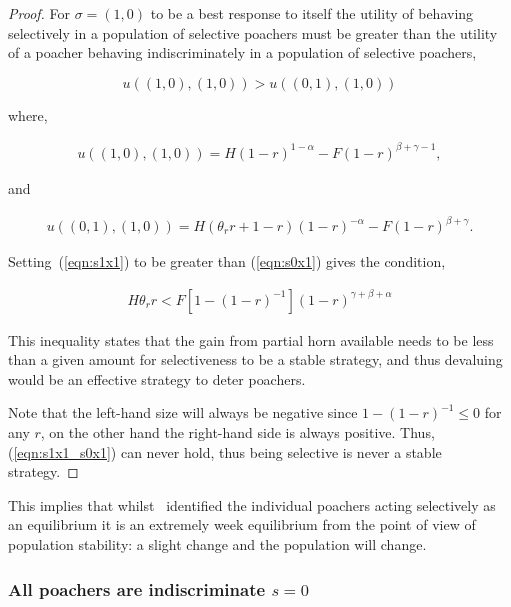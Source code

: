 \documentclass[10pt]{article}
\begin{document}
\begin{proof}
	For \(\sigma=(1, 0)\) to be a best response to itself the utility of behaving 
	selectively in a population of selective poachers must be greater than the utility
	of a poacher behaving indiscriminately in a population of selective poachers,

	\begin{equation}
	u((1, 0),(1, 0)) > u((0, 1),(1, 0))
	\end{equation}
	
	where,
	
	\begin{eqnarray}
	\label{eqn:s1x1}
 	u((1, 0),(1, 0)) = H(1 - r)^{1 - \alpha} - F(1 - r)^{\beta + \gamma - 1},
	\end{eqnarray}
	
	and 
	
	\begin{eqnarray}
	\label{eqn:s0x1}
	u((0, 1),(1, 0)) = H(\theta_r r +1 - r)(1 - r)^{-\alpha} - F(1 - r)^{\beta + \gamma} .
	\end{eqnarray}

	Setting~(\ref{eqn:s1x1}) to be greater than (\ref{eqn:s0x1}) gives the 
	condition,

	\begin{eqnarray}
	\label{eqn:s1x1_s0x1}
	H \theta_r r < F [1 - (1 - r)^{-1}](1 - r)^{\gamma + \beta + \alpha}
	\end{eqnarray}

	This inequality states that the gain from partial horn available needs to be less
	than a given amount for selectiveness to be a stable strategy, and thus devaluing
	would be  an effective strategy to deter poachers.

	Note that the left-hand size  will always be negative since \(1-(1-r)^{-1} \leq 0\)
	for any \(r\), on the other hand the right-hand side is always positive.
	Thus, (\ref{eqn:s1x1_s0x1}) can never hold, thus being selective is never
	a stable strategy.
\end{proof}

This implies that whilst~\cite{Lee} identified the individual poachers 
acting selectively as an equilibrium it is an extremely week equilibrium from 
the point of view of population stability: a slight change and the population 
will change.

\subsubsection{All poachers are indiscriminate \(s=0\)}
\end{document}
